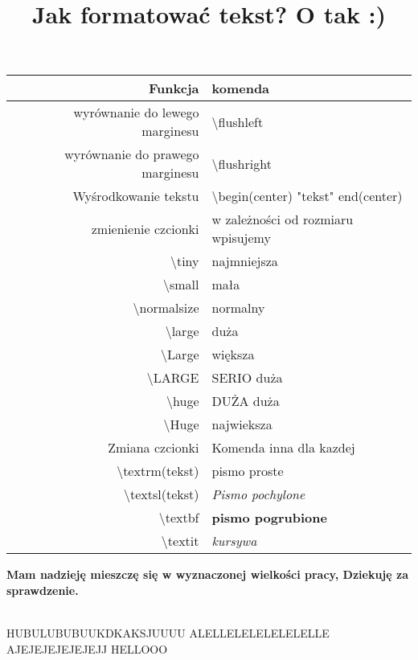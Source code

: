 \documentclass{article}
\begin{document}
\newpage
\begin{center}
\title{\textbf{Jak formatować tekst?} }
\end{center}

\begin{center}
\title{\huge O tak :)}
\maketitle
\end{center}
\begin{center}
\begin{tabular}{|r|l|}
\hline
Funkcja & komenda \\
\hline
wyrównanie do lewego marginesu & \textbackslash flushleft \\
wyrównanie do prawego marginesu & \textbackslash flushright \\
Wyśrodkowanie tekstu & \textbackslash begin(center) "tekst" end(center)\\
zmienienie czcionki & w zależności od rozmiaru wpisujemy \\
\textbackslash tiny & najmniejsza \\
\textbackslash small & mała \\
\textbackslash normalsize & normalny \\
\textbackslash large & duża \\
\textbackslash Large & większa \\
\textbackslash LARGE & SERIO duża \\
\textbackslash huge & DUŻA duża\\
\textbackslash Huge & najwieksza\\
Zmiana czcionki & Komenda inna dla kazdej \\
\textbackslash textrm(tekst) & pismo proste \\
\textbackslash textsl(tekst) & \textsl{Pismo pochylone}\\
\textbackslash textbf & \textbf{pismo pogrubione} \\
\textbackslash textit & \textit{kursywa}\\
\hline


\end{tabular}
\end{center}
\begin{center}
\textbf{Mam nadzieję mieszczę się w wyznaczonej wielkości pracy,
Dziekuję za sprawdzenie.}
\end{center}
\\HUBULUBUBUUKDKAKSJUUUU ALELLELELELELELELLE AJEJEJEJEJEJEJJ HELLOOO\\
\end{document}
